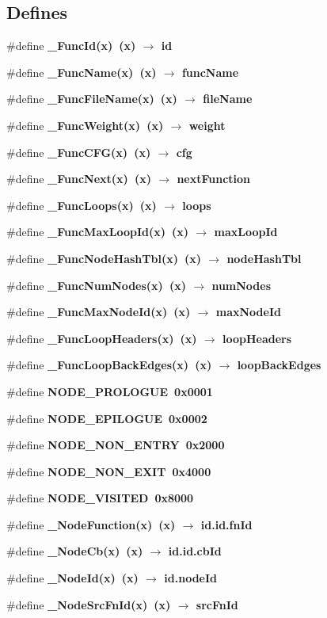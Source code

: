 \subsection*{Defines}
\begin{CompactItemize}
\item 
\#define \bf{\_\-Func\-Id}(x)~(x) $\rightarrow$ id
\item 
\#define \bf{\_\-Func\-Name}(x)~(x) $\rightarrow$ func\-Name
\item 
\#define \bf{\_\-Func\-File\-Name}(x)~(x) $\rightarrow$ file\-Name
\item 
\#define \bf{\_\-Func\-Weight}(x)~(x) $\rightarrow$ weight
\item 
\#define \bf{\_\-Func\-CFG}(x)~(x) $\rightarrow$ cfg
\item 
\#define \bf{\_\-Func\-Next}(x)~(x) $\rightarrow$ next\-Function
\item 
\#define \bf{\_\-Func\-Loops}(x)~(x) $\rightarrow$ loops
\item 
\#define \bf{\_\-Func\-Max\-Loop\-Id}(x)~(x) $\rightarrow$ max\-Loop\-Id
\item 
\#define \bf{\_\-Func\-Node\-Hash\-Tbl}(x)~(x) $\rightarrow$ node\-Hash\-Tbl
\item 
\#define \bf{\_\-Func\-Num\-Nodes}(x)~(x) $\rightarrow$ num\-Nodes
\item 
\#define \bf{\_\-Func\-Max\-Node\-Id}(x)~(x) $\rightarrow$ max\-Node\-Id
\item 
\#define \bf{\_\-Func\-Loop\-Headers}(x)~(x) $\rightarrow$ \bf{loop\-Headers}
\item 
\#define \bf{\_\-Func\-Loop\-Back\-Edges}(x)~(x) $\rightarrow$ \bf{loop\-Back\-Edges}
\item 
\#define \bf{NODE\_\-PROLOGUE}~0x0001
\item 
\#define \bf{NODE\_\-EPILOGUE}~0x0002
\item 
\#define \bf{NODE\_\-NON\_\-ENTRY}~0x2000
\item 
\#define \bf{NODE\_\-NON\_\-EXIT}~0x4000
\item 
\#define \bf{NODE\_\-VISITED}~0x8000
\item 
\#define \bf{\_\-Node\-Function}(x)~(x) $\rightarrow$ id.id.fn\-Id
\item 
\#define \bf{\_\-Node\-Cb}(x)~(x) $\rightarrow$ id.id.cb\-Id
\item 
\#define \bf{\_\-Node\-Id}(x)~(x) $\rightarrow$ \bf{id.node\-Id}
\item 
\#define \bf{\_\-Node\-Src\-Fn\-Id}(x)~(x) $\rightarrow$ src\-Fn\-Id

\end{CompactItemize}
